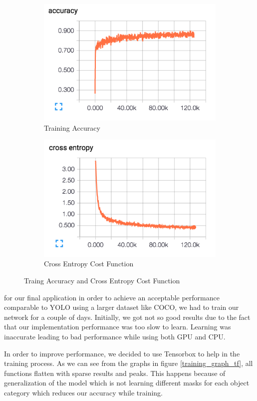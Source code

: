 \begin{figure}
\centering
\begin{subfigure}{.5\textwidth}
  \centering
  \includegraphics[width=.8\linewidth]{figures/graph_accuracy.png}
  \caption{Training Accuracy}
  \label{fig:sub1}
\end{subfigure}%
\begin{subfigure}{.5\textwidth}
  \centering
  \includegraphics[width=.8\linewidth]{figures/cross_entropy.png}
  \caption{Cross Entropy Cost Function}
  \label{fig:sub2}
\end{subfigure}
\caption{Traing Accuracy and Cross Entropy Cost Function}
\label{fig:accuracy_crossentropy}
\end{figure}

\newpage
for our final application in order to achieve an acceptable performance comparable to YOLO using a larger dataset like COCO, we had to train our network for a couple of days. Initially, we got not so good results due to the fact that our implementation performance was too slow to learn. Learning was inaccurate leading to bad performance while using both GPU and CPU. 

In order to improve performance, we decided to use Tensorbox to help in the training process. As we can see from the graphs in figure \ref{training_graph_tf}, all functions flatten with sparse results and peaks. This happens because of generalization of the model which is not learning different masks for each object category which reduces our accuracy while training.


